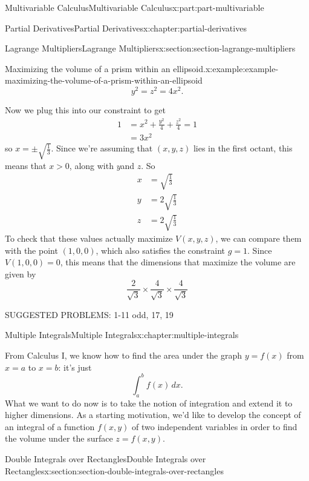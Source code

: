 \documentclass[twoside,10pt,]{tufte-book}
\numberwithin{equation}{part}
\begin{document}
\begin{partptx}{Multivariable Calculus}{}{Multivariable Calculus}{}{}{x:part:part-multivariable}
\begin{chapterptx}{Partial Derivatives}{}{Partial Derivatives}{}{}{x:chapter:partial-derivatives}
\begin{sectionptx}{Lagrange Multipliers}{}{Lagrange Multipliers}{}{}{x:section:section-lagrange-multipliers}
\begin{example}{Maximizing the volume of a prism within an ellipsoid.}{x:example:example-maximizing-the-volume-of-a-prism-within-an-ellipsoid}
\begin{equation*}
y^{2} = z^{2} = 4x^{2}.
\end{equation*}
%
\par
Now we plug this into our constraint to get%
\begin{align*}
1 & = x^{2} + \frac{y^{2}}{4} + \frac{z^{2}}{4} = 1 \\
& = 3x^{2} 
\end{align*}
so \(x = \pm\sqrt{\frac{1}{3}}\). Since we're assuming that \((x,y,z)\) lies in the first octant, this means that \(x > 0\), along with \(y \)and \(z\). So%
\begin{align*}
x & = \sqrt{\frac{1}{3}} \\
y & = 2\sqrt{\frac{1}{3}} \\
z & = 2\sqrt{\frac{1}{3}} 
\end{align*}
To check that these values actually maximize \(V(x,y,z)\), we can compare them with the point \((1,0,0)\), which also satisfies the constraint \(g = 1\). Since \(V(1,0,0) = 0\), this means that the dimensions that maximize the volume are given by%
\begin{equation*}
\frac{2}{\sqrt{3}}\times\frac{4}{\sqrt{3}}\times\frac{4}{\sqrt{3}}
\end{equation*}
%
\end{example}
SUGGESTED PROBLEMS: 1-11 odd, 17, 19%
\end{sectionptx}
\end{chapterptx}
%
\typeout{************************************************}
\typeout{************************************************}
%
\begin{chapterptx}{Multiple Integrals}{}{Multiple Integrals}{}{}{x:chapter:multiple-integrals}
\begin{introduction}{}%
From Calculus I, we know how to find the area under the graph \(y = f(x)\) from \(x = a\) to \(x = b\): it's just%
\begin{equation*}
\int_{a}^{b}f(x)\,dx.
\end{equation*}
What we want to do now is to take the notion of integration and extend it to higher dimensions. As a starting motivation, we'd like to develop the concept of an integral of a function \(f(x,y)\) of two independent variables in order to find the volume under the surface \(z = f(x,y)\).%
\end{introduction}%
%
%
\typeout{************************************************}
\typeout{************************************************}
%
\begin{sectionptx}{Double Integrals over Rectangles}{}{Double Integrals over Rectangles}{}{}{x:section:section-double-integrals-over-rectangles}

\end{sectionptx}
\end{chapterptx}
\end{partptx}
\end{document}
